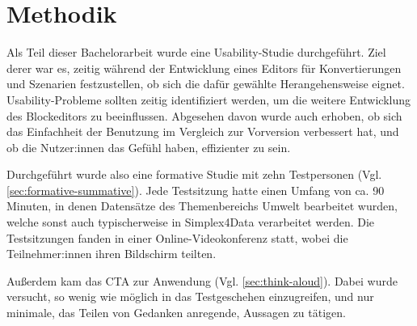 \section{Methodik}

Als Teil dieser Bachelorarbeit wurde eine Usability-Studie durchgeführt. Ziel derer war es, zeitig während der Entwicklung eines Editors für Konvertierungen und Szenarien festzustellen, ob sich die dafür gewählte Herangehensweise eignet. Usability-Probleme sollten zeitig identifiziert werden, um die weitere Entwicklung des Blockeditors zu beeinflussen. Abgesehen davon wurde auch erhoben, ob sich das Einfachheit der Benutzung im Vergleich zur Vorversion verbessert hat, und ob die Nutzer:innen das Gefühl haben, effizienter zu sein.

Durchgeführt wurde also eine formative Studie mit zehn Testpersonen (Vgl. \ref{sec:formative-summative}). Jede Testsitzung hatte einen Umfang von ca. 90 Minuten, in denen Datensätze des Themenbereichs Umwelt bearbeitet wurden, welche sonst auch typischerweise in Simplex4Data verarbeitet werden. Die Testsitzungen fanden in einer Online-Videokonferenz statt, wobei die Teilnehmer:innen ihren Bildschirm teilten.

Außerdem kam das \acf{CTA} zur Anwendung (Vgl. \ref{sec:think-aloud}). Dabei wurde versucht, so wenig wie möglich in das Testgeschehen einzugreifen, und nur minimale, das Teilen von Gedanken anregende, Aussagen zu tätigen.
